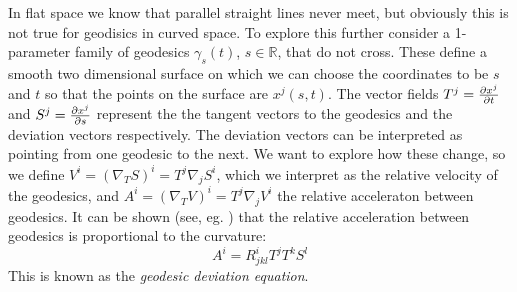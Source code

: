 In flat space we know that parallel straight lines never meet, but obviously this is not true for geodisics in curved space. To explore this further consider a 1-parameter family of geodesics $\gamma_s(t)$, $s \in \mathbb{R}$, that do not cross. These define a smooth two dimensional surface on which we can choose the coordinates to be $s$ and $t$ so that the points on the surface are $x^j (s,t)$. The vector fields $T^j = \frac{{\partial} x^j}{{\partial} t}$ and $S^j = \frac{{\partial} x^j}{{\partial} s}$ represent the the tangent vectors to the geodesics and the deviation vectors respectively. The deviation vectors can be interpreted as pointing from one geodesic to the next. We want to explore how these change, so we define $V^i = (\nabla_T S)^i = T^j \nabla_j S^i$, which we interpret as the relative velocity of the geodesics, and $A^i = (\nabla_T V)^i = T^j \nabla_j V^i$ the relative acceleraton between geodesics. It can be shown (see, eg. \cite{Carroll}) that the relative acceleration between geodesics is proportional to the curvature:
\begin{equation}\label{GeoDevEq}
A^i = R^i_{jkl}T^j T^k S^l
\end{equation}
This is known as the \textit{geodesic deviation equation}. 




